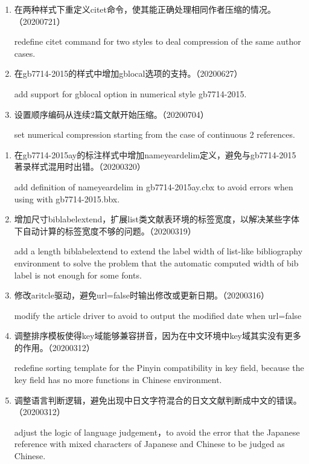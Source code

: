 \label{up:20200721}

\begin{enumerate}

\item 在两种样式下重定义citet命令，使其能正确处理相同作者压缩的情况。（20200721）

redefine citet command for two styles to deal compression of the same author cases.

\item 在gb7714-2015的样式中增加gblocal选项的支持。（20200627）

add support for gblocal option in numerical style gb7714-2015.

\item 设置顺序编码从连续2篇文献开始压缩。（20200704）

set numerical compression starting from the case of continuous 2 references.
\end{enumerate}

\label{up:2020320}

\begin{enumerate}

\item 在gb7714-2015ay的标注样式中增加nameyeardelim定义，避免与gb7714-2015著录样式混用时出错。（20200320）

add definition of nameyeardelim in gb7714-2015ay.cbx to avoid errors when using with gb7714-2015.bbx.

\item 增加尺寸biblabelextend，扩展list类文献表环境的标签宽度，以解决某些字体下自动计算的标签宽度不够的问题。（20200319）

add a length biblabelextend to extend the label width of list-like bibliography environment to solve the problem that the automatic computed width of bib label is not enough for some fonts.

\item 修改aritcle驱动，避免url=false时输出修改或更新日期。（20200316）

modify the article driver to avoid to output the modified date when url=false

\item 调整排序模板使得key域能够兼容拼音，因为在中文环境中key域其实没有更多的作用。（20200312）

redefine sorting template for the Pinyin compatibility in key field, because the key field has no more functions in Chinese environment.

\item 调整语言判断逻辑，避免出现中日文字符混合的日文文献判断成中文的错误。（20200312）

adjust the logic of language judgement，to avoid the error that the Japanese reference with mixed characters of Japanese and Chinese to be judged as Chinese.

\end{enumerate}


